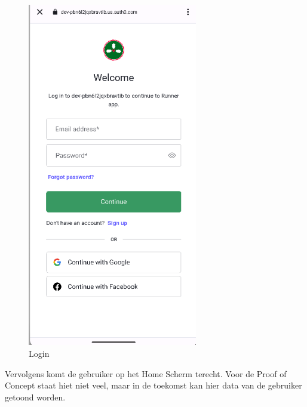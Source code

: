     \begin{figure}[htbp]
        \includegraphics[width=20em]{./graphics/login.png}
        \centering
        \caption{Login}
        \label{fig:login}
    \end{figure}

    Vervolgens komt de gebruiker op het Home Scherm terecht. Voor de Proof of Concept staat hiet niet veel, 
    maar in de toekomst kan hier data van de gebruiker getoond worden.

